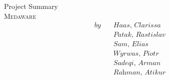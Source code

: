 \vspace*{\fill}
\titleornament
\vspace*{\fill}
\begin{center}
	{
		\Large Project Summary
	} \\[2\baselineskip]
	{
		\Huge \textsc{Medaware}
	} \\[\baselineskip]
	\begin{align*}
		\textit{by} \quad &\textit{Haas, Clarissa} \\
				  &\textit{Patak, Rastislav} \\
				  &\textit{Sam, Elias} \\
				  &\textit{Wyrwas, Piotr} \\
				  &\textit{Sadeqi, Arman} \\
				  &\textit{Rahman, Atikur}
	\end{align*}
\end{center}
\vspace*{\fill}
{
	\hspace*{\fill}
	\titleornament
}
\vspace*{\fill}
